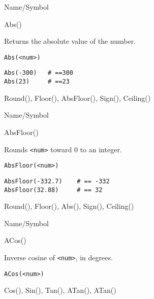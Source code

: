 \rl 



\begin{desc}{Name/Symbol}

\item[Name/Symbol] 	Abs()

\item[Description]   	Returns the absolute value of the number.

\item[Usage]
\begin{verbatim}
Abs(<num>)
\end{verbatim}        

\item[Example]
\begin{verbatim}
Abs(-300)  	# ==300
Abs(23)    	# ==23
\end{verbatim}

\item[See Also]     	Round(), Floor(), AbsFloor(), Sign(), Ceiling()
\end{desc}

\rl


\begin{desc}{Name/Symbol}

\item[Name/Symbol]  	AbsFloor()

\item[Description]  	Rounds \verb+<num>+ toward 0 to an integer.

\item[Usage]       	
\begin{verbatim}
AbsFloor(<num>)
\end{verbatim}

\item[Example]
\begin{verbatim}
AbsFloor(-332.7)   	# == -332
AbsFloor(32.88)    	# == 32
\end{verbatim}

\item[See Also]     	Round(), Floor(), Abs(), Sign(), Ceiling()
\end{desc}

\rl


\begin{desc}{Name/Symbol}

\item[Name/Symbol] 	ACos() 

\item[Description]  	Inverse cosine of \verb+<num>+, in degrees.

\item[Usage]
\begin{verbatim}
ACos(<num>)
\end{verbatim}

\item[Example]	

\item[See Also]    	Cos(), Sin(), Tan(), ATan(), ATan() 

\end{desc}


